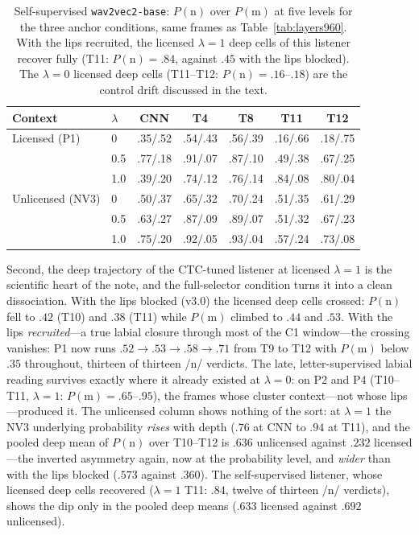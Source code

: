 \documentclass[11pt,a4paper]{article}
\newcommand{\sampa}[1]{\texttt{#1}}
\newcommand{\lam}{\lambda}
\begin{document}
\begin{table}[t]
\small
\centering
\begin{tabular}{@{}llccccc@{}}
\toprule
Context & $\lam$ & CNN & T4 & T8 & T11 & T12 \\
\midrule
Licensed (P1) & 0 & .35/.52 & .54/.43 & .56/.39 & .16/.66 & .18/.75 \\
 & 0.5 & .77/.18 & .91/.07 & .87/.10 & .49/.38 & .67/.25 \\
 & 1.0 & .39/.20 & .74/.12 & .76/.14 & .84/.08 & .80/.04 \\
\addlinespace
Unlicensed (NV3) & 0 & .50/.37 & .65/.32 & .70/.24 & .51/.35 & .61/.29 \\
 & 0.5 & .63/.27 & .87/.09 & .89/.07 & .51/.32 & .67/.23 \\
 & 1.0 & .75/.20 & .92/.05 & .93/.04 & .57/.24 & .73/.08 \\
\bottomrule
\end{tabular}
\caption{Self-supervised \sampa{wav2vec2-base}: $P(\mathrm{n})$
over $P(\mathrm{m})$ at five levels for the three anchor conditions,
same frames as Table~\ref{tab:layers960}. With the lips recruited,
the licensed $\lam=1$ deep cells of this listener recover fully
(T11: $P(\mathrm{n}) = .84$, against $.45$ with the lips blocked).
The $\lam=0$ licensed deep cells (T11--T12:
$P(\mathrm{n})=.16$--$.18$) are the control drift discussed in the
text.}
\label{tab:layersbase}
\end{table}

Second, the deep trajectory of the CTC-tuned listener at licensed
$\lam=1$ is the scientific heart of the note, and the full-selector
condition turns it into a clean dissociation. With the lips blocked
(v3.0) the licensed deep cells crossed: $P(\mathrm{n})$ fell to
$.42$ (T10) and $.38$ (T11) while $P(\mathrm{m})$ climbed to $.44$
and $.53$. With the lips \emph{recruited}---a true labial closure
through most of the C1 window---the crossing vanishes: P1 now runs
$.52 \rightarrow .53 \rightarrow .58 \rightarrow .71$ from T9 to
T12 with $P(\mathrm{m})$ below $.35$ throughout, thirteen of
thirteen /n/ verdicts. The late, letter-supervised labial reading
survives exactly where it already existed at $\lam=0$: on P2 and
P4 (T10--T11, $\lam=1$: $P(\mathrm{m}) = .65$--$.95$), the frames
whose cluster context---not whose lips---produced it. The unlicensed
column shows nothing of the sort: at $\lam=1$ the NV3 underlying
probability \emph{rises} with depth ($.76$ at CNN to $.94$ at T11),
and the pooled deep mean of $P(\mathrm{n})$ over T10--T12 is $.636$
unlicensed against $.232$ licensed---the inverted asymmetry again,
now at the probability level, and \emph{wider} than with the lips
blocked ($.573$ against $.360$). The self-supervised listener,
whose licensed deep cells recovered ($\lam=1$ T11: $.84$, twelve
of thirteen /n/ verdicts), shows the dip only in the pooled deep
means ($.633$ licensed against $.692$ unlicensed).
\end{document}
